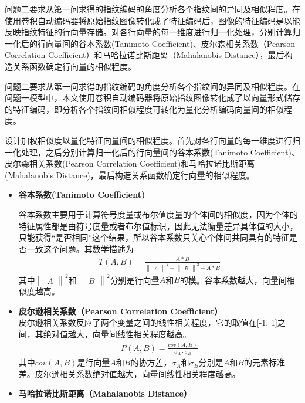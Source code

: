 \documentclass{whutmod}
\begin{document}
\begin{itemize}
问题二要求从第一问求得的指纹编码的角度分析各个指纹间的异同及相似程度。在使用卷积自动编码器将原始指纹图像转化成了特征编码后，图像的特征编码是以能反映指纹特征的行向量存储。对各行向量的每一维度进行归一化处理，分别计算归一化后的行向量间的谷本系数(Tanimoto Coefficient)、皮尔森相关系数（Pearson Correlation Coefficient）和马哈拉诺比斯距离（Mahalanobis Distance），最后构造关系函数确定行向量的相似程度。


问题二要求从第一问求得的指纹编码的角度分析各个指纹间的异同及相似程度。在问题一模型中，本文使用卷积自动编码器将原始指纹图像转化成了以向量形式储存的特征编码，即分析各个指纹间相似程度可转化为量化分析编码向量间的相似程度。

设计加权相似度以量化特征向量间的相似程度。首先对各行向量的每一维度进行归一化处理，之后分别计算归一化后的行向量间的谷本系数(Tanimoto Coefficient)、皮尔森相关系数(Pearson Correlation Coefficient)和马哈拉诺比斯距离(Mahalanobis Distance)，最后构造关系函数确定行向量的相似程度。

			
			
			\begin{itemize}
				\item \textbf{谷本系数(Tanimoto Coefficient)}
				
				谷本系数主要用于计算符号度量或布尔值度量的个体间的相似度，因为个体的特征属性都是由符号度量或者布尔值标识，因此无法衡量差异具体值的大小，只能获得“是否相同”这个结果，所以谷本系数只关心个体间共同具有的特征是否一致这个问题。其数学描述为
				\begin{gather}
				T(A,B)=\frac{A\ast B}{\begin{Vmatrix}
						A
					\end{Vmatrix}^2+\begin{Vmatrix}
						B
					\end{Vmatrix}^2-A\ast B}
				\end{gather}
				其中$\begin{Vmatrix}
				A
				\end{Vmatrix}^2$和$\begin{Vmatrix}
				B
				\end{Vmatrix}^2$分别是行向量$A$和$B$的模。谷本系数越大，向量间相似度越高。
				\item \textbf{皮尔逊相关系数（Pearson Correlation Coefficient）}\\
				皮尔逊相关系数反应了两个变量之间的线性相关程度，它的取值在[-1, 1]之间，其绝对值越大，向量间线性相关程度越高。
				\begin{gather}
					P(A,B)=\frac{cov(A,B)}{\sigma_A\cdot \sigma_B}
				\end{gather}
				其中$cov(A,B)$是行向量$A$和$B$的协方差，$\sigma_A$和$\sigma_B$分别是$A$和$B$的元素标准差。皮尔逊相关系数绝对值越大，向量间线性相关程度越高。
				\item \textbf{马哈拉诺比斯距离（Mahalanobis Distance）}\\


\end{itemize}
\end{itemize}
\end{document}
